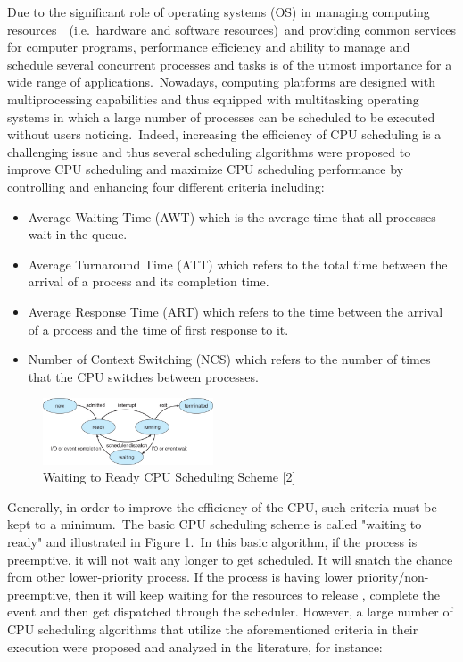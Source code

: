 Due to the significant role of operating systems (OS) in managing
computing resources~\cite{Alsulami2019}~(i.e.~hardware and software
resources)~and providing common services for computer programs, performance
efficiency and ability to manage and schedule several concurrent
processes and tasks is of the utmost importance for a wide range
of applications.~Nowadays, computing platforms are designed with
multiprocessing capabilities and thus equipped with multitasking
operating systems in which a large number of processes can be
scheduled to be executed without users noticing.~Indeed, increasing
the efficiency of CPU scheduling is a challenging issue and thus
several scheduling algorithms were proposed to improve CPU
scheduling and maximize CPU scheduling performance by controlling
and enhancing four different criteria including:

\begin{itemize}
    \item Average Waiting Time (AWT) which is the average time
    that all processes wait in the queue.
    \item Average Turnaround Time (ATT) which refers to the total
    time between the arrival of a process and its completion time.
    \item Average Response Time (ART) which refers to the time
    between the arrival of a process and the time of first
    response to it.
    \item Number of Context Switching (NCS) which refers to the
    number of times that the CPU switches between processes.
\end{itemize}

\begin{figure}[h]
    \centering
    \includegraphics[width=0.45\textwidth]{./figures/figure01}
    \caption{Waiting to Ready CPU Scheduling Scheme [2]}
    \label{fig:fig.waiting-to-ready-cpu-scheduling-scheme-[2]}
\end{figure}

Generally, in order to improve the efficiency of the
CPU, such criteria must be kept to a minimum.~The basic
CPU scheduling scheme is called "waiting to ready" and
illustrated in Figure 1.~In this basic algorithm, if the process
is preemptive, it will not wait any longer to get scheduled.
It will snatch the chance from other lower-priority process.
If the process is having lower priority/non-preemptive, then
it will keep waiting for the resources to release , complete
the event and then get dispatched through the scheduler.
However, a large number of CPU scheduling algorithms that
utilize the aforementioned criteria in their execution were
proposed and analyzed in the literature, for instance:

